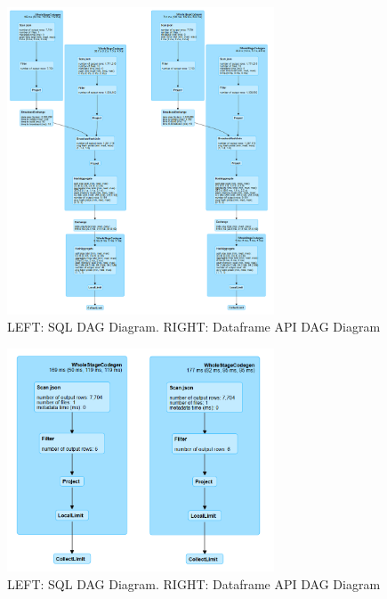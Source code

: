 \documentclass[]{article}
\begin{document}
\begin{figure}[h]

{\centering \includegraphics[width=300px]{images/query3} 

}

\caption{\label{fig:figs}LEFT: SQL DAG Diagram. RIGHT: Dataframe API DAG Diagram}\label{fig:unnamed-chunk-9}
\end{figure}

\begin{figure}[h]

{\centering \includegraphics[width=300px]{images/query4} 

}

\caption{\label{fig:figs}LEFT: SQL DAG Diagram. RIGHT: Dataframe API DAG Diagram}\label{fig:unnamed-chunk-10}
\end{figure}
\end{document}
